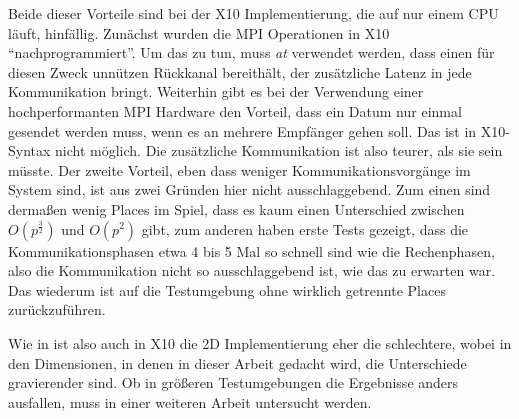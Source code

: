 Beide dieser Vorteile sind bei der X10 Implementierung, die auf nur einem CPU läuft, hinfällig. Zunächst wurden die MPI Operationen in X10 \enquote{nachprogrammiert}. Um das zu tun, muss \textit{at} verwendet werden, dass einen für diesen Zweck unnützen Rückkanal bereithält, der zusätzliche Latenz in jede Kommunikation bringt. Weiterhin gibt es bei der Verwendung einer hochperformanten MPI Hardware den Vorteil, dass ein Datum nur einmal gesendet werden muss, wenn es an mehrere Empfänger gehen soll. Das ist in X10-Syntax nicht möglich. Die zusätzliche Kommunikation ist also teurer, als sie sein müsste. 
Der zweite Vorteil, eben dass weniger Kommunikationsvorgänge im System sind, ist aus zwei Gründen hier nicht ausschlaggebend. Zum einen sind dermaßen wenig Places im Spiel, dass es kaum einen Unterschied zwischen $O(p^{\frac{3}{2}})$ und $O(p^2)$ gibt, zum anderen haben erste Tests gezeigt, dass die Kommunikationsphasen etwa 4 bis 5 Mal so schnell sind wie die Rechenphasen, also die Kommunikation nicht so ausschlaggebend ist, wie das zu erwarten war. Das wiederum ist auf die Testumgebung ohne wirklich getrennte Places zurückzuführen.

Wie in \cite{Buluc:2011} ist also auch in X10 die 2D Implementierung eher die schlechtere, wobei in den Dimensionen, in denen in dieser Arbeit gedacht wird, die Unterschiede gravierender sind. Ob in größeren Testumgebungen die Ergebnisse anders ausfallen, muss in einer weiteren Arbeit untersucht werden.

